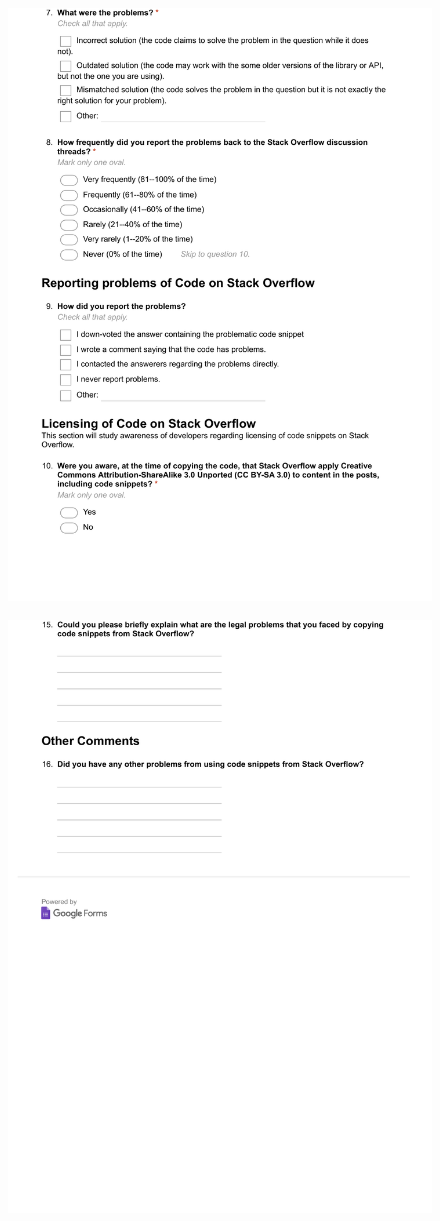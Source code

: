 \documentclass{svjour3}                     %
\begin{document}
\begin{figure}[H]
	\centering
	\includegraphics[width=0.9\linewidth]{visitor-3}
	\label{fig:visitor-3}
\end{figure}

\begin{figure}[H]
	\centering
	\includegraphics[width=0.9\linewidth]{visitor-4}
	\label{fig:visitor-4}
\end{figure}
\end{document}
